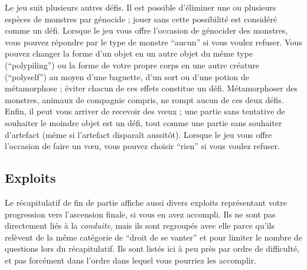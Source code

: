 \documentclass[titlepage]{article}
\begin{document}
Le jeu suit plusieurs autres défis.  Il est possible
d'éliminer une ou plusieurs espèces de monstres par génocide ; jouer sans
cette possibilité est considéré comme un défi.  Lorsque le jeu vous offre
l'occasion de génocider des monstres, vous pouvez répondre par le type de monstre
``aucun'' si vous voulez refuser.  Vous pouvez changer la forme d'un objet en
un autre objet du même type (``polypiling'') ou la forme de votre propre
corps en une autre créature (``polyself'') au moyen d'une baguette, d'un sort ou
d'une potion de métamorphose ; éviter chacun de ces effets constitue un défi.
Métamorphoser des monstres, animaux de compagnie compris, ne rompt aucun de ces
deux défis.
Enfin, il peut vous arriver de recevoir des vœux ; une partie sans tentative de
souhaiter le moindre objet est un défi, tout comme une partie sans souhaiter
d'artefact (même si l'artefact disparaît aussitôt).  Lorsque le
jeu vous offre l'occasion de faire un vœu, vous pouvez
choisir ``rien'' si vous voulez refuser.

\subsection*{Exploits}

Le récapitulatif de fin de partie affiche aussi divers exploits
représentant votre progression vers l'ascension finale, si vous en avez
accompli.
Ils ne sont pas directement liés à la \textit{conduite}, mais ils sont regroupés avec
elle parce qu'ils relèvent de la même catégorie de ``droit de se vanter''
et pour limiter le nombre de questions lors du récapitulatif.
Ils sont listés ici à peu près par ordre de difficulté, et pas forcément dans l'ordre
dans lequel vous pourriez les accomplir.
\end{document}
